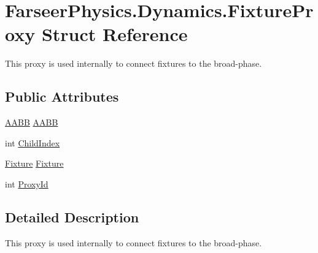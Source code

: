 \hypertarget{struct_farseer_physics_1_1_dynamics_1_1_fixture_proxy}{\section{Farseer\+Physics.\+Dynamics.\+Fixture\+Proxy Struct Reference}
\label{struct_farseer_physics_1_1_dynamics_1_1_fixture_proxy}
}


This proxy is used internally to connect fixtures to the broad-\/phase.  


\subsection*{Public Attributes}
\begin{DoxyCompactItemize}
\item 
\hyperlink{struct_farseer_physics_1_1_collision_1_1_a_a_b_b}{A\+A\+B\+B} \hyperlink{struct_farseer_physics_1_1_dynamics_1_1_fixture_proxy_a6837847b7e87955775270bb79e08879a}{A\+A\+B\+B}
\item 
int \hyperlink{struct_farseer_physics_1_1_dynamics_1_1_fixture_proxy_a42c1e1c430816182006bc9cac9fa8e0a}{Child\+Index}
\item 
\hyperlink{class_farseer_physics_1_1_dynamics_1_1_fixture}{Fixture} \hyperlink{struct_farseer_physics_1_1_dynamics_1_1_fixture_proxy_a576671c5efdeadb3e5db90940962105d}{Fixture}
\item 
int \hyperlink{struct_farseer_physics_1_1_dynamics_1_1_fixture_proxy_adb51c2de11448694564ca91d5237216b}{Proxy\+Id}
\end{DoxyCompactItemize}


\subsection{Detailed Description}
This proxy is used internally to connect fixtures to the broad-\/phase. 



